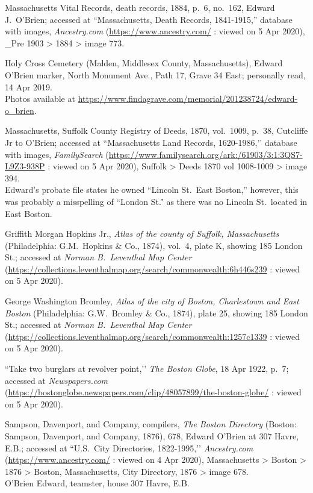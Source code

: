 \begin{thebibliography}{99}
	Massachusetts Vital Records, death records, 1884, p.\ 6, no.\ 162, Edward J.\ O'Brien; accessed at ``Massachusetts, Death Records, 1841-1915,'' database with images, \textit{Ancestry.com} (\url{https://www.ancestry.com/} : viewed on 5 Apr 2020), \_Pre 1903 > 1884 > image 773.	
	
	Holy Cross Cemetery (Malden, Middlesex County, Massachusetts), Edward O'Brien marker, North Monument Ave., Path 17, Grave 34 East; personally read, 14 Apr 2019. \\
	Photos available at \url{https://www.findagrave.com/memorial/201238724/edward-o_brien}.

	Massachusetts, Suffolk County Registry of Deeds, 1870, vol.\ 1009, p.\ 38, Cutcliffe Jr to O’Brien; accessed at ``Massachusetts Land Records, 1620-1986,’’ database with images, \textit{FamilySearch} (\url{https://www.familysearch.org/ark:/61903/3:1:3QS7-L9Z3-938P} : viewed on 5 Apr 2020), Suffolk > Deeds 1870 vol 1008-1009 > image 394.\\
	Edward's probate file states he owned ``Lincoln St.\  East Boston,'' however, this was probably a misspelling of ``London St.\'' as there was no Lincoln St.\ located in East Boston.\cite{EastBostonStreets}
	
	Griffith Morgan Hopkins Jr., \textit{Atlas of the county of Suffolk, Massachusetts} (Philadelphia: G.M.\ Hopkins \& Co., 1874), vol.\ 4, plate K, showing 185 London St.; accessed at \textit{Norman B.\ Leventhal Map Center} (\url{https://collections.leventhalmap.org/search/commonwealth:6h446s239} : viewed on 5 Apr 2020).
	
	George Washington Bromley, \textit{Atlas of the city of Boston, Charlestown and East Boston} (Philadelphia: G.W.\ Bromley \& Co., 1874), plate 25, showing 185 London St.; accessed at \textit{Norman B.\ Leventhal Map Center} (\url{https://collections.leventhalmap.org/search/commonwealth:1257c1339} : viewed on 5 Apr 2020).
	
	``Take two burglars at revolver point,’’ \textit{The Boston Globe}, 18 Apr 1922, p.\ 7; accessed at \textit{Newspapers.com} (\url{https://bostonglobe.newspapers.com/clip/48057899/the-boston-globe/} : viewed on 5 Apr 2020).
	
	Sampson, Davenport, and Company, compilers, \textit{The Boston Directory} (Boston: Sampson, Davenport, and Company, 1876), 678, Edward O’Brien at 307 Havre, E.B.; accessed at ``U.S.\ City Directories, 1822-1995,’’ \textit{Ancestry.com} (\url{https://www.ancestry.com/} : viewed on 4 Apr 2020), Massachusetts > Boston > 1876 > Boston, Massachusetts, City Directory, 1876 > image 678.\\
	O’Brien Edward, teamster, house 307 Havre, E.B.
	

\end{thebibliography}
